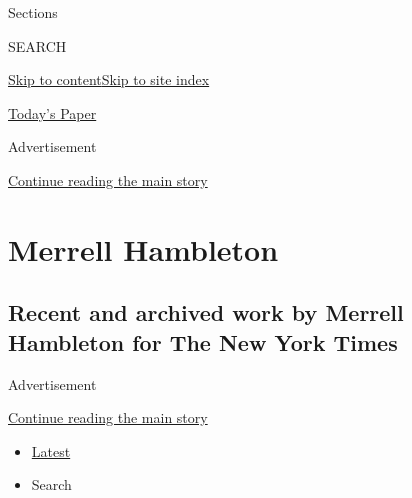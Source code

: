 Sections

SEARCH

\protect\hyperlink{site-content}{Skip to
content}\protect\hyperlink{site-index}{Skip to site index}

\href{https://myaccount.nytimes3xbfgragh.onion/auth/login?response_type=cookie\&client_id=vi}{}

\href{https://www.nytimes3xbfgragh.onion/section/todayspaper}{Today's
Paper}

Advertisement

\protect\hyperlink{after-top}{Continue reading the main story}

\hypertarget{merrell-hambleton}{%
\section{Merrell Hambleton}\label{merrell-hambleton}}

\hypertarget{recent-and-archived-work-by-merrell-hambleton-for-the-new-york-times}{%
\subsection{Recent and archived work by Merrell Hambleton for The New
York
Times}\label{recent-and-archived-work-by-merrell-hambleton-for-the-new-york-times}}

Advertisement

\protect\hyperlink{after-mid1}{Continue reading the main story}

\begin{itemize}
\tightlist
\item
  \protect\hyperlink{stream-panel}{Latest}
\item
  Search
\end{itemize}

